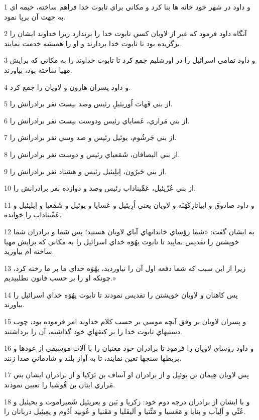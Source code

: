 \par 1 و داود در شهر خود خانه ها بنا کرد و مکاني براي تابوت خدا فراهم ساخته، خيمه اي به جهت آن برپا نمود.
\par 2 آنگاه داود فرمود که غير از لاويان کسي تابوت خدا را برندارد زيرا خداوند ايشان را برگزيده بود تا تابوت خدا بردارند و او را هميشه خدمت نمايند.
\par 3 و داود تمامي اسرائيل را در اورشليم جمع کرد تا تابوت خداوند را به مکاني که برايش مهيا ساخته بود، بياورند.
\par 4 و داود پسران هارون و لاويان را جمع کرد.
\par 5 از بني قَهات اُوريئيلِ رئيس وصد بيست نفر برادرانش را.
\par 6 از بني مَراري، عَساياي رئيس ودوست بيست نفر برادرانش را.
\par 7 از بني جَرشُوم، يوئيل رئيس و صد وسي نفر برادرانش را.
\par 8 از بني اليصافان، شَمَعياي رئيس و دوست نفر برادرانش را.
\par 9 از بني حَبرُون، اِيلِيئيل رئيس و هشتاد نفر برادرانش را.
\par 10 از بني عُزّيئيل، عَمِّيناداب رئيس وصد و دوازده نفر برادرانش را.
\par 11 و داود صادوق و ابياتارِکَهَنَه و لاويان يعني اُرِيئيل و عَسايا و يوئيل و شَمَعيا و اِيليئيل و عَمِّيناداب را خوانده،
\par 12 به ايشان گفت: «شما رؤساي خاندانهاي آباي لاويان هستيد؛ پس شما و برادران شما خويشتن را تقديس نماييد تا تابوت يهُوَه خداي اسرائيل را به مکاني که برايش مهيا ساخته ام بياوريد.
\par 13 زيرا از اين سبب که شما دفعه اول آن را نياورديد، يهُوَه خداي ما بر ما رخنه کرد، چونکه او را بر حسب قانون نطلبيديم.»
\par 14 پس کاهنان و لاويان خويشتن را تقديس نمودند تا تابوت يهُوَه خداي اسرائيل را بياورند.
\par 15 و پسران لاويان بر وفق آنچه موسي بر حسب کلام خداوند امر فرموده بود، چوب دستيهاي تابوت خدا را بر کتفهاي خود گذاشته، آن را برداشتند.
\par 16 و داود رؤساي لاويان را فرمود تا برادران خود مغنيان را با آلات موسيقي از عودها و بربطها سنجها تعين نمايند، تا به آواز بلند و شادماني صدا زنند.
\par 17 پس لاويان هِيمان بن يوئيل و از برادران او آساف بن بَرَکيا و از برادران ايشان بني مَراري ايتان بن قُوشيا را تعيين نمودند.
\par 18 و با ايشان از برادران درجه دوم خود: زکريا و بَين و يعريئيل شَميراموت و يحيئيل و عُنِّي و اَلِيآب و بنايا و مَعَسيا و مَتِّتيا و اَليفَليا و مَقَنيا و عُوبيد اَدُوم و يعِيئِيل دربانان را.

